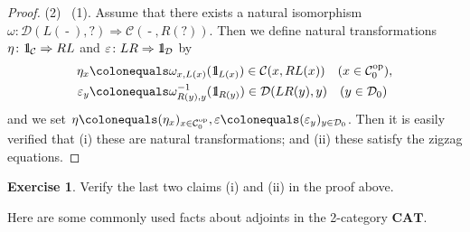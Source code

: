 \documentclass{surv-l}
\numberwithin{equation}{chapter}
\numberwithin{figure}{chapter}
\theoremstyle{plain}
\theoremstyle{definition}
\newtheorem{exc}[thm]{Exercise}
\theoremstyle{remark}
\newcommand{\id}{1\kern-.25em{\text{{\rm l}}}}
\DeclareMathOperator{\blank}{-}
\begin{document}
\begin{proof}
(2) \text{$\Rightarrow$}\  (1).
Assume that there exists a natural isomorphism
$\omega\colon {\mathcal{D}}(L(\blank), ?) \Rightarrow {\mathcal{C}}(\blank, R(?))$.
Then we define natural transformations
$\eta\colon \id_{{\mathcal{C}}} \Rightarrow RL$ and $\varepsilon \colon LR \Rightarrow \id_{{\mathcal{D}}}$
by
\begin{equation*}
\begin{aligned}
\eta_x&\colonequals  \omega_{x, L(x)}(\id_{L(x)})\in {\mathcal{C}}(x, RL(x)) \quad(x \in {\mathcal{C}}^{\mathrm{op}}_0),
\\
\varepsilon_y&\colonequals  \omega^{-1}_{R(y), y}(\id_{R(y)}) \in {\mathcal{D}}(LR(y), y) \quad(y \in {\mathcal{D}}_0)
\end{aligned}
\end{equation*}
and we set $\eta\colonequals  (\eta_x)_{x \in {\mathcal{C}}^{\mathrm{op}}_0}, \varepsilon\colonequals  (\varepsilon_y)_{y \in {\mathcal{D}}_0}$.
Then it is easily verified that (i) these are natural transformations; and
(ii) these satisfy the zigzag equations.
\end{proof}

\begin{exc}
Verify the last two claims (i) and (ii) in the proof above.
\end{exc}

Here are some commonly used facts about adjoints
in the 2-category $\mathbf{CAT}$.
\end{document}
